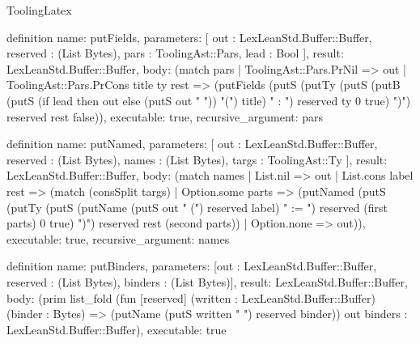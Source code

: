 \begin{lexlean}{ToolingLatex}
\begin{semanticmodule}
definition{
  name: putFields,
  parameters: [
    out : LexLeanStd.Buffer::Buffer,
    reserved : (List Bytes),
    pars : ToolingAst::Pars,
    lead : Bool
  ],
  result: LexLeanStd.Buffer::Buffer,
  body: (match pars
    | ToolingAst::Pars.PrNil => out
    | ToolingAst::Pars.PrCons title ty rest => (putFields (putS (putTy (putS (putB (putS (if lead then out else (putS out " ")) "(") title) " : ") reserved ty 0 true) ")") reserved rest false)),
  executable: true,
  recursive_argument: pars
}

definition{
  name: putNamed,
  parameters: [
    out : LexLeanStd.Buffer::Buffer,
    reserved : (List Bytes),
    names : (List Bytes),
    targs : ToolingAst::Ty
  ],
  result: LexLeanStd.Buffer::Buffer,
  body: (match names
    | List.nil => out
    | List.cons label rest => (match (consSplit targs)
      | Option.some parts => (putNamed (putS (putTy (putS (putName (putS out " (") reserved label) " := ") reserved (first parts) 0 true) ")") reserved rest (second parts))
      | Option.none => out)),
  executable: true,
  recursive_argument: names
}

definition{
  name: putBinders,
  parameters: [out : LexLeanStd.Buffer::Buffer, reserved : (List Bytes), binders : (List Bytes)],
  result: LexLeanStd.Buffer::Buffer,
  body: (prim list_fold (fun [reserved] (written : LexLeanStd.Buffer::Buffer) (binder : Bytes) => (putName (putS written " ") reserved binder)) out binders : LexLeanStd.Buffer::Buffer),
  executable: true
}


\end{semanticmodule}
\end{lexlean}

